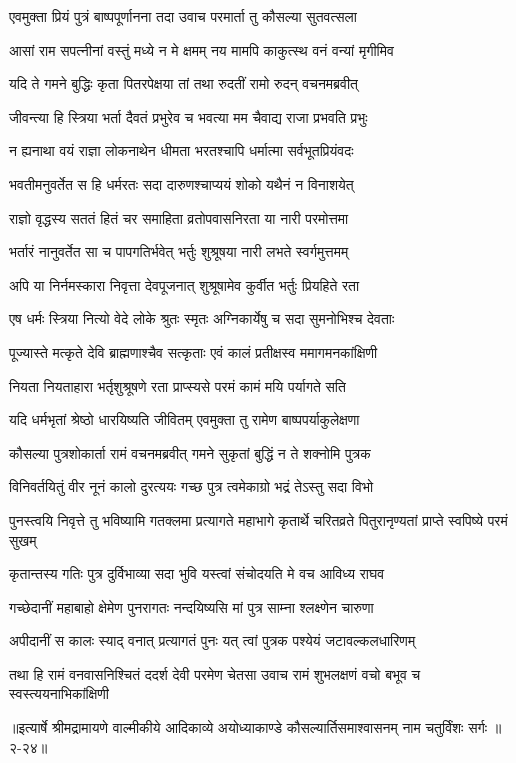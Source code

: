 \twolineshloka
{एवमुक्ता प्रियं पुत्रं बाष्पपूर्णानना तदा}
{उवाच परमार्ता तु कौसल्या सुतवत्सला} %

\twolineshloka
{आसां राम सपत्नीनां वस्तुं मध्ये न मे क्षमम्}
{नय मामपि काकुत्स्थ वनं वन्यां मृगीमिव} %

\twolineshloka
{यदि ते गमने बुद्धिः कृता पितरपेक्षया}
{तां तथा रुदतीं रामो रुदन् वचनमब्रवीत्} %

\twolineshloka
{जीवन्त्या हि स्त्रिया भर्ता दैवतं प्रभुरेव च}
{भवत्या मम चैवाद्य राजा प्रभवति प्रभुः} %

\twolineshloka
{न ह्यनाथा वयं राज्ञा लोकनाथेन धीमता}
{भरतश्चापि धर्मात्मा सर्वभूतप्रियंवदः} %

\twolineshloka
{भवतीमनुवर्तेत स हि धर्मरतः सदा}
{दारुणश्चाप्ययं शोको यथैनं न विनाशयेत्} %

\twolineshloka
{राज्ञो वृद्धस्य सततं हितं चर समाहिता}
{व्रतोपवासनिरता या नारी परमोत्तमा} %

\twolineshloka
{भर्तारं नानुवर्तेत सा च पापगतिर्भवेत्}
{भर्तुः शुश्रूषया नारी लभते स्वर्गमुत्तमम्} %

\twolineshloka
{अपि या निर्नमस्कारा निवृत्ता देवपूजनात्}
{शुश्रूषामेव कुर्वीत भर्तुः प्रियहिते रता} %

\twolineshloka
{एष धर्मः स्त्रिया नित्यो वेदे लोके श्रुतः स्मृतः}
{अग्निकार्येषु च सदा सुमनोभिश्च देवताः} %

\twolineshloka
{पूज्यास्ते मत्कृते देवि ब्राह्मणाश्चैव सत्कृताः}
{एवं कालं प्रतीक्षस्व ममागमनकांक्षिणी} %

\twolineshloka
{नियता नियताहारा भर्तृशुश्रूषणे रता}
{प्राप्स्यसे परमं कामं मयि पर्यागते सति} %

\twolineshloka
{यदि धर्मभृतां श्रेष्ठो धारयिष्यति जीवितम्}
{एवमुक्ता तु रामेण बाष्पपर्याकुलेक्षणा} %

\twolineshloka
{कौसल्या पुत्रशोकार्ता रामं वचनमब्रवीत्}
{गमने सुकृतां बुद्धिं न ते शक्नोमि पुत्रक} %

\twolineshloka
{विनिवर्तयितुं वीर नूनं कालो दुरत्ययः}
{गच्छ पुत्र त्वमेकाग्रो भद्रं तेऽस्तु सदा विभो} %

\threelineshloka
{पुनस्त्वयि निवृत्ते तु भविष्यामि गतक्लमा}
{प्रत्यागते महाभागे कृतार्थे चरितव्रते}
{पितुरानृण्यतां प्राप्ते स्वपिष्ये परमं सुखम्} %

\twolineshloka
{कृतान्तस्य गतिः पुत्र दुर्विभाव्या सदा भुवि}
{यस्त्वां संचोदयति मे वच आविध्य राघव} %

\twolineshloka
{गच्छेदानीं महाबाहो क्षेमेण पुनरागतः}
{नन्दयिष्यसि मां पुत्र साम्ना श्लक्ष्णेन चारुणा} %

\twolineshloka
{अपीदानीं स कालः स्याद् वनात् प्रत्यागतं पुनः}
{यत् त्वां पुत्रक पश्येयं जटावल्कलधारिणम्} %

\twolineshloka
{तथा हि रामं वनवासनिश्चितं ददर्श देवी परमेण चेतसा}
{उवाच रामं शुभलक्षणं वचो बभूव च स्वस्त्ययनाभिकांक्षिणी} %


॥इत्यार्षे श्रीमद्रामायणे वाल्मीकीये आदिकाव्ये अयोध्याकाण्डे कौसल्यार्तिसमाश्वासनम् नाम चतुर्विंशः सर्गः ॥२-२४॥
